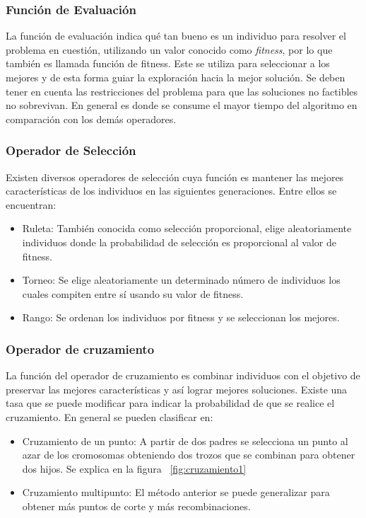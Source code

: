 \subsubsection{Función de Evaluación} 
La función de evaluación indica qué tan bueno es un individuo para resolver el problema en cuestión, utilizando un valor conocido como \emph{fitness}, por lo que también es llamada función de fitness. Este se utiliza para seleccionar a los mejores y de esta forma guiar la exploración hacia la mejor solución.
Se deben tener en cuenta las restricciones del problema para que las soluciones no factibles no sobrevivan.
En general es donde se consume el mayor tiempo del algoritmo en comparación con los demás operadores.

\subsubsection{Operador de Selección}
Existen diversos operadores de selección cuya función es mantener las mejores características de los individuos en las siguientes generaciones. Entre ellos se encuentran:
\begin{itemize}
	\item Ruleta: También conocida como selección proporcional, elige aleatoriamente individuos donde la probabilidad de selección es proporcional al valor de fitness.
	\item Torneo: Se elige aleatoriamente un determinado número de individuos los cuales compiten entre sí usando su valor de fitness.
	\item Rango: Se ordenan los individuos por fitness y se seleccionan los mejores.
\end{itemize}

\subsubsection{Operador de cruzamiento}
La función del operador de cruzamiento es combinar individuos con el objetivo de preservar las mejores características y así lograr mejores soluciones. 
Existe una tasa que se puede modificar para indicar la probabilidad de que se realice el cruzamiento. En general se pueden clasificar en:

\begin{itemize}
	\item Cruzamiento de un punto: A partir de dos padres se selecciona un punto al azar de los cromosomas obteniendo dos trozos que se combinan para obtener dos hijos. Se explica en la figura ~\ref{fig:cruzamiento1}
	\item Cruzamiento multipunto: El método anterior se puede generalizar para obtener más puntos de corte y más recombinaciones.
\end{itemize}

